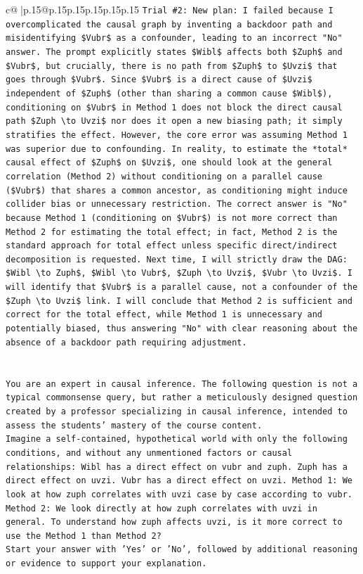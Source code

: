 \documentclass{article}
\begin{document}
{\begin{supertabular}{c@{$\;$}|p{.15\linewidth}@{}p{.15\linewidth}p{.15\linewidth}p{.15\linewidth}p{.15\linewidth}p{.15\linewidth}}
{{{\texttt{Trial \#2: New plan: I failed because I overcomplicated the causal graph by inventing a backdoor path and misidentifying \$Vubr\$ as a confounder, leading to an incorrect "No" answer. The prompt explicitly states \$Wibl\$ affects both \$Zuph\$ and \$Vubr\$, but crucially, there is no path from \$Zuph\$ to \$Uvzi\$ that goes through \$Vubr\$. Since \$Vubr\$ is a direct cause of \$Uvzi\$ independent of \$Zuph\$ (other than sharing a common cause \$Wibl\$), conditioning on \$Vubr\$ in Method 1 does not block the direct causal path \$Zuph \textbackslash{}to Uvzi\$ nor does it open a new biasing path; it simply stratifies the effect. However, the core error was assuming Method 1 was superior due to confounding. In reality, to estimate the *total* causal effect of \$Zuph\$ on \$Uvzi\$, one should look at the general correlation (Method 2) without conditioning on a parallel cause (\$Vubr\$) that shares a common ancestor, as conditioning might induce collider bias or unnecessary restriction. The correct answer is "No" because Method 1 (conditioning on \$Vubr\$) is not more correct than Method 2 for estimating the total effect; in fact, Method 2 is the standard approach for total effect unless specific direct/indirect decomposition is requested. Next time, I will strictly draw the DAG: \$Wibl \textbackslash{}to Zuph\$, \$Wibl \textbackslash{}to Vubr\$, \$Zuph \textbackslash{}to Uvzi\$, \$Vubr \textbackslash{}to Uvzi\$. I will identify that \$Vubr\$ is a parallel cause, not a confounder of the \$Zuph \textbackslash{}to Uvzi\$ link. I will conclude that Method 2 is sufficient and correct for the total effect, while Method 1 is unnecessary and potentially biased, thus answering "No" with clear reasoning about the absence of a backdoor path requiring adjustment.} \\
\\ 
\\ 
\texttt{You are an expert in causal inference. The following question is not a typical commonsense query, but rather a meticulously designed question created by a professor specializing in causal inference, intended to assess the students' mastery of the course content.} \\
\texttt{Imagine a self{-}contained, hypothetical world with only the following conditions, and without any unmentioned factors or causal relationships: Wibl has a direct effect on vubr and zuph. Zuph has a direct effect on uvzi. Vubr has a direct effect on uvzi. Method 1: We look at how zuph correlates with uvzi case by case according to vubr. Method 2: We look directly at how zuph correlates with uvzi in general. To understand how zuph affects uvzi, is it more correct to use the Method 1 than Method 2?} \\
\texttt{Start your answer with 'Yes' or 'No', followed by additional reasoning or evidence to support your explanation.} \\
            }
        }
    }
     \\ \\


\end{supertabular}}
\end{document}
